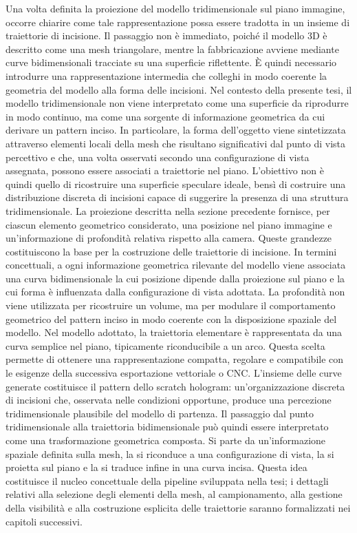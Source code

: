 \documentclass[a4paper,11pt,titlepage,twoside]{book}
\newcommand{\1}{\mathbf{1}}
\numberwithin{equation}{chapter}
\theoremstyle{plain}
\theoremstyle{definition}
\begin{document}
	Una volta definita la proiezione del modello tridimensionale sul piano immagine, occorre chiarire come tale rappresentazione possa essere tradotta in un insieme di traiettorie di incisione. Il passaggio non è immediato, poiché il modello 3D è descritto come una mesh triangolare, mentre la fabbricazione avviene mediante curve bidimensionali tracciate su una superficie riflettente. È quindi necessario introdurre una rappresentazione intermedia che colleghi in modo coerente la geometria del modello alla forma delle incisioni.
	Nel contesto della presente tesi, il modello tridimensionale non viene interpretato come una superficie da riprodurre in modo continuo, ma come una sorgente di informazione geometrica da cui derivare un pattern inciso. In particolare, la forma dell’oggetto viene sintetizzata attraverso elementi locali della mesh che risultano significativi dal punto di vista percettivo e che, una volta osservati secondo una configurazione di vista assegnata, possono essere associati a traiettorie nel piano. L’obiettivo non è quindi quello di ricostruire una superficie speculare ideale, bensì di costruire una distribuzione discreta di incisioni capace di suggerire la presenza di una struttura tridimensionale.
	La proiezione descritta nella sezione precedente fornisce, per ciascun elemento geometrico considerato, una posizione nel piano immagine e un’informazione di profondità relativa rispetto alla camera. Queste grandezze costituiscono la base per la costruzione delle traiettorie di incisione. In termini concettuali, a ogni informazione geometrica rilevante del modello viene associata una curva bidimensionale la cui posizione dipende dalla proiezione sul piano e la cui forma è influenzata dalla configurazione di vista adottata. La profondità non viene utilizzata per ricostruire un volume, ma per modulare il comportamento geometrico del pattern inciso in modo coerente con la disposizione spaziale del modello.
	Nel modello adottato, la traiettoria elementare è rappresentata da una curva semplice nel piano, tipicamente riconducibile a un arco. Questa scelta permette di ottenere una rappresentazione compatta, regolare e compatibile con le esigenze della successiva esportazione vettoriale o CNC. L’insieme delle curve generate costituisce il pattern dello scratch hologram: un’organizzazione discreta di incisioni che, osservata nelle condizioni opportune, produce una percezione tridimensionale plausibile del modello di partenza.
	Il passaggio dal punto tridimensionale alla traiettoria bidimensionale può quindi essere interpretato come una trasformazione geometrica composta. Si parte da un’informazione spaziale definita sulla mesh, la si riconduce a una configurazione di vista, la si proietta sul piano e la si traduce infine in una curva incisa. Questa idea costituisce il nucleo concettuale della pipeline sviluppata nella tesi; i dettagli relativi alla selezione degli elementi della mesh, al campionamento, alla gestione della visibilità e alla costruzione esplicita delle traiettorie saranno formalizzati nei capitoli successivi.
	
\end{document}
